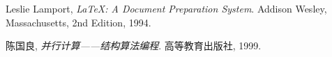 \documentclass[fontsize=11pt, %
                             paper=a4, %
                             oneside, %
                             captions=tableheading,
                             index=totoc,
                             hyperref]{labbook}
\begin{document}

\begin{thebibliography}{9}

Leslie Lamport,
\emph{\LaTeX: A Document Preparation System}.
Addison Wesley, Massachusetts,
2nd Edition,
1994.

陈国良,
\emph{并行计算——结构算法编程}.
高等教育出版社,
1999.

\end{thebibliography}

\end{document}
